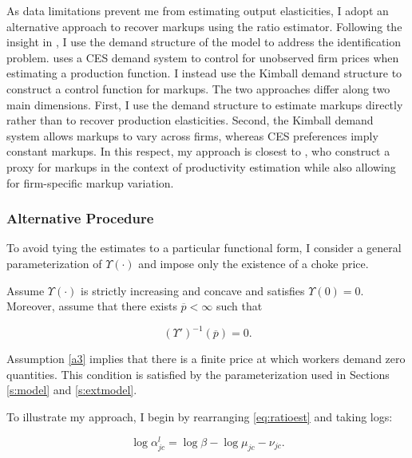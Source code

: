 As data limitations prevent me from estimating output elasticities, I adopt an alternative approach to recover markups using the ratio estimator. Following the insight in \textcite{DeLoecker11}, I use the demand structure of the model to address the identification problem. \textcite{DeLoecker11} uses a CES demand system to control for unobserved firm prices when estimating a production function. I instead use the Kimball demand structure to construct a control function for markups. The two approaches differ along two main dimensions. First, I use the demand structure to estimate markups directly rather than to recover production elasticities. Second, the Kimball demand system allows markups to vary across firms, whereas CES preferences imply constant markups. In this respect, my approach is closest to \textcite{blum2024abc}, who construct a proxy for markups in the context of productivity estimation while also allowing for firm-specific markup variation.

\subsubsection{Alternative Procedure}\label{s:myproc}
To avoid tying the estimates to a particular functional form, I consider a general parameterization of $\Upsilon(\cdot)$ and impose only the existence of a choke price.

\begin{assum}\label{a3}
Assume $\Upsilon(\cdot)$ is strictly increasing and concave and satisfies $\Upsilon(0) = 0$. Moreover, assume that there exists $\overline{p} < \infty$ such that

\begin{equation*}
	\left(\Upsilon'\right)^{-1}(\overline{p}) = 0.
\end{equation*}

\end{assum}

Assumption \ref{a3} implies that there is a finite price at which workers demand zero quantities. This condition is satisfied by the \textcite{Klenow&Willis16} parameterization used in Sections \ref{s:model} and \ref{s:extmodel}.

To illustrate my approach, I begin by rearranging \eqref{eq:ratioest} and taking logs:

\begin{equation}\label{eq:naiveest}
\log \alpha_{jc}^l = \log \beta - \log \mu_{jc} - \nu_{jc}.
\end{equation}

